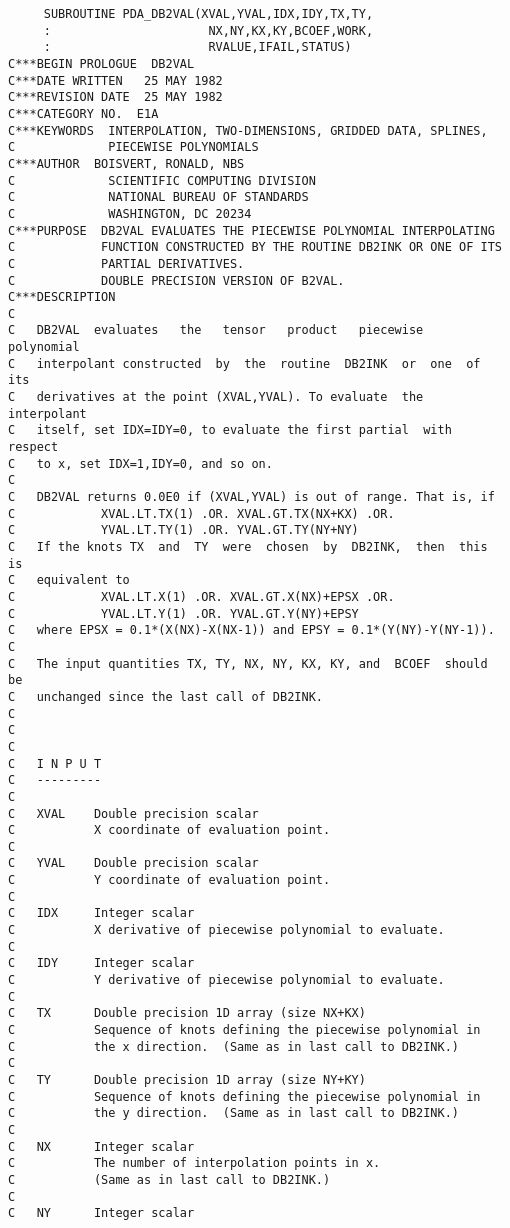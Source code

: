 \begin{verbatim}
     SUBROUTINE PDA_DB2VAL(XVAL,YVAL,IDX,IDY,TX,TY,
     :                      NX,NY,KX,KY,BCOEF,WORK,
     :                      RVALUE,IFAIL,STATUS)
C***BEGIN PROLOGUE  DB2VAL
C***DATE WRITTEN   25 MAY 1982
C***REVISION DATE  25 MAY 1982
C***CATEGORY NO.  E1A
C***KEYWORDS  INTERPOLATION, TWO-DIMENSIONS, GRIDDED DATA, SPLINES,
C             PIECEWISE POLYNOMIALS
C***AUTHOR  BOISVERT, RONALD, NBS
C             SCIENTIFIC COMPUTING DIVISION
C             NATIONAL BUREAU OF STANDARDS
C             WASHINGTON, DC 20234
C***PURPOSE  DB2VAL EVALUATES THE PIECEWISE POLYNOMIAL INTERPOLATING
C            FUNCTION CONSTRUCTED BY THE ROUTINE DB2INK OR ONE OF ITS
C            PARTIAL DERIVATIVES.
C            DOUBLE PRECISION VERSION OF B2VAL.
C***DESCRIPTION
C
C   DB2VAL  evaluates   the   tensor   product   piecewise   polynomial
C   interpolant constructed  by  the  routine  DB2INK  or  one  of  its
C   derivatives at the point (XVAL,YVAL). To evaluate  the  interpolant
C   itself, set IDX=IDY=0, to evaluate the first partial  with  respect
C   to x, set IDX=1,IDY=0, and so on.
C
C   DB2VAL returns 0.0E0 if (XVAL,YVAL) is out of range. That is, if
C            XVAL.LT.TX(1) .OR. XVAL.GT.TX(NX+KX) .OR.
C            YVAL.LT.TY(1) .OR. YVAL.GT.TY(NY+NY)
C   If the knots TX  and  TY  were  chosen  by  DB2INK,  then  this  is
C   equivalent to
C            XVAL.LT.X(1) .OR. XVAL.GT.X(NX)+EPSX .OR.
C            YVAL.LT.Y(1) .OR. YVAL.GT.Y(NY)+EPSY
C   where EPSX = 0.1*(X(NX)-X(NX-1)) and EPSY = 0.1*(Y(NY)-Y(NY-1)).
C
C   The input quantities TX, TY, NX, NY, KX, KY, and  BCOEF  should  be
C   unchanged since the last call of DB2INK.
C
C
C
C   I N P U T
C   ---------
C
C   XVAL    Double precision scalar
C           X coordinate of evaluation point.
C
C   YVAL    Double precision scalar
C           Y coordinate of evaluation point.
C
C   IDX     Integer scalar
C           X derivative of piecewise polynomial to evaluate.
C
C   IDY     Integer scalar
C           Y derivative of piecewise polynomial to evaluate.
C
C   TX      Double precision 1D array (size NX+KX)
C           Sequence of knots defining the piecewise polynomial in
C           the x direction.  (Same as in last call to DB2INK.)
C
C   TY      Double precision 1D array (size NY+KY)
C           Sequence of knots defining the piecewise polynomial in
C           the y direction.  (Same as in last call to DB2INK.)
C
C   NX      Integer scalar
C           The number of interpolation points in x.
C           (Same as in last call to DB2INK.)
C
C   NY      Integer scalar

\end{verbatim}
